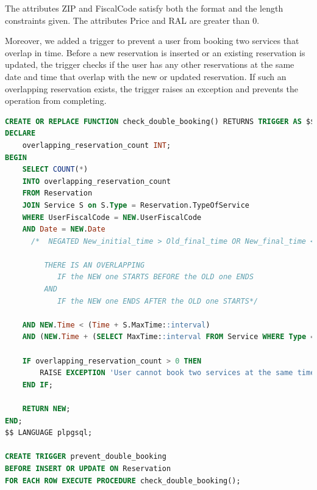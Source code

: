 \documentclass{article}
\begin{document}
The attributes ZIP and FiscalCode satisfy both the format and the length constraints given. The attributes Price and RAL are greater than 0.

Moreover, we added a trigger to prevent a user from booking two services that overlap in time. Before a new reservation is inserted or an existing reservation is updated, the trigger checks if the user has any other reservations at the same date and time that overlap with the new or updated reservation. If such an overlapping reservation exists, the trigger raises an exception and prevents the operation from completing.
\begin{lstlisting}[language=SQL]
CREATE OR REPLACE FUNCTION check_double_booking() RETURNS TRIGGER AS $$
DECLARE
    overlapping_reservation_count INT;
BEGIN
    SELECT COUNT(*)
    INTO overlapping_reservation_count
    FROM Reservation
    JOIN Service S on S.Type = Reservation.TypeOfService
    WHERE UserFiscalCode = NEW.UserFiscalCode
    AND Date = NEW.Date
      /*  NEGATED New_initial_time > Old_final_time OR New_final_time < old_initial_time

         THERE IS AN OVERLAPPING
            IF the NEW one STARTS BEFORE the OLD one ENDS
         AND
            IF the NEW one ENDS AFTER the OLD one STARTS*/

    AND NEW.Time < (Time + S.MaxTime::interval)
    AND (NEW.Time + (SELECT MaxTime::interval FROM Service WHERE Type = NEW.TypeOfService)) > Time;

    IF overlapping_reservation_count > 0 THEN
        RAISE EXCEPTION 'User cannot book two services at the same time';
    END IF;

    RETURN NEW;
END;
$$ LANGUAGE plpgsql;

CREATE TRIGGER prevent_double_booking
BEFORE INSERT OR UPDATE ON Reservation
FOR EACH ROW EXECUTE PROCEDURE check_double_booking();

\end{lstlisting}
\end{document}
